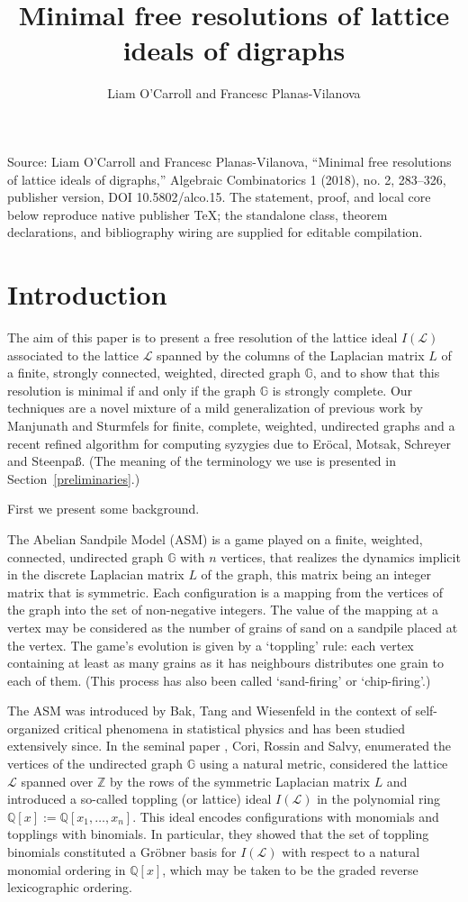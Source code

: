 \documentclass[10pt]{amsart}
\newcommand{\mbz}{\mbox{$\mathbb{Z}$}}
\newcommand{\mbq}{\mbox{$\mathbb{Q}$}}
\newcommand{\mbg}{\mbox{$\mathbb{G}$}}
\newcommand{\mcl}{\mbox{$\mathcal{L}$}}
\theoremstyle{definition}
\theoremstyle{remark}
\begin{document}
\title{Minimal free resolutions of lattice ideals of digraphs}
\author{Liam O'Carroll and Francesc Planas-Vilanova}
\date{}
\maketitle
\sloppy
\noindent Source: Liam O'Carroll and Francesc Planas-Vilanova, ``Minimal free resolutions of lattice ideals of digraphs,'' Algebraic Combinatorics 1 (2018), no. 2, 283--326, publisher version, DOI 10.5802/alco.15. The statement, proof, and local core below reproduce native publisher TeX; the standalone class, theorem declarations, and bibliography wiring are supplied for editable compilation.
\section{Introduction}

The aim of this paper is to present a free resolution of the lattice
ideal $I(\mcl)$ associated to the lattice $\mcl$ spanned by the
columns of the Laplacian matrix $L$ of a finite, strongly connected,
weighted, directed graph $\mbg$, and to show that this resolution is
minimal if and only if the graph $\mbg$ is strongly complete. Our
techniques are a novel mixture of a mild generalization of previous
work by Manjunath and Sturmfels for finite, complete, weighted,
undirected graphs and a recent refined algorithm for computing
syzygies due to Er\"ocal, Motsak, Schreyer and Steenpa{\ss}. (The
meaning of the terminology we use is presented in
Section~\ref{preliminaries}.)

First we present some background.

The Abelian Sandpile Model (ASM) is a game played on a finite,
weighted, connected, undirected graph $\mathbb{G}$ with $n$ vertices,
that realizes the dynamics implicit in the discrete Laplacian matrix
$L$ of the graph, this matrix being an integer matrix that is
symmetric. Each configuration is a mapping from the vertices of the
graph into the set of non-negative integers. The value of the mapping
at a vertex may be considered as the number of grains of sand on a
sandpile placed at the vertex. The game's evolution is given by a
`toppling' rule: each vertex containing at least as many grains as it
has neighbours distributes one grain to each of them.  (This process
has also been called `sand-firing' or `chip-firing'.)

The ASM was introduced by Bak, Tang and Wiesenfeld \cite{btw} in the
context of self-organized critical phenomena in statistical physics
and has been studied extensively since. In the seminal paper
\cite{crs}, Cori, Rossin and Salvy, enumerated the vertices of the
undirected graph $\mbg$ using a natural metric, considered the lattice
$\mcl$ spanned over $\mbz$ by the rows of the symmetric Laplacian
matrix $L$ and introduced a so-called toppling (or lattice) ideal
$I(\mcl)$ in the polynomial ring $\mbq[x]:=\mbq[x_1,\ldots
  ,x_n]$. This ideal encodes configurations with monomials and
topplings with binomials. In particular, they showed that the set of
toppling binomials constituted a Gr\"obner basis for $I(\mcl)$ with
respect to a natural monomial ordering in $\mbq[x]$, which may be
taken to be the graded reverse lexicographic ordering.
\end{document}
